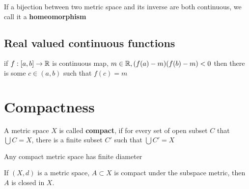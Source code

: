 \begin{definition}
  If a bijection between two metric space and its inverse are
both continuous, we call it a \textbf{homeomorphism}
\end{definition}

\subsection{Real valued continuous functions}

\begin{theorem}
  if $f: [a, b] \to \mathbb R$ is continuous map,
  $m \in \mathbb R, (f(a) - m)(f(b) - m) < 0$ then there is some 
  $c \in (a, b)$ such that $f(c) = m$
\end{theorem}

\section{Compactness}

\begin{definition}
  A metric space $X$ is called \textbf{compact}, if for every set of open subset 
  $C$ that $\bigcup C = X$, there is a finite subset $C'$ such that $\bigcup C' = X$
\end{definition}

\begin{theorem}
  Any compact metric space has finite diameter
\end{theorem}

\begin{theorem}
  If $(X, d)$ is a metric space, $A \subset X$ is compact under the
subspace metric, then $A$ is closed in $X$.
\end{theorem}